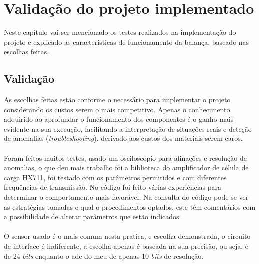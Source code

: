 \chapter{Validação do projeto implementado}
Neste capítulo vai ser mencionado os testes realizados na implementação do projeto e explicado as características de funcionamento da balança, baseado nas escolhas feitas.
\section{Validação}
As escolhas feitas estão conforme o necessário para implementar o projeto considerando os custos serem o mais competitivo. Apenas o conhecimento adquirido ao aprofundar o funcionamento dos componentes é o ganho mais evidente na sua execução, facilitando a interpretação de situações reais e deteção de anomalias (\textit{troubleshooting}), derivado aos custos dos materiais serem caros.
\\
\\
Foram feitos muitos testes, usado um osciloscópio para afinações e resolução de anomalias, o que deu mais trabalho foi a biblioteca do amplificador de célula de carga HX711, foi testado com os parâmetros permitidos e com diferentes frequências de transmissão. No código foi feito várias experiências para determinar o comportamento mais favorável. Na consulta do código pode-se ver as estratégias tomadas e qual o procedimentos optados, este têm comentários com a possibilidade de alterar parâmetros que estão indicados.
\\
\\
O sensor usado é o mais comum nesta pratica, e escolha demonstrada, o circuito de interface é indiferente, a escolha apenas é baseada na sua precisão, ou seja, é de 24 \textit{bits} enquanto o \acs{adc} do \acs{mcu} de apenas 10 \textit{bits} de resolução.
